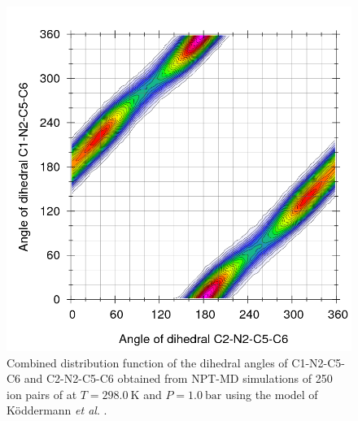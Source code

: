\documentclass[3p,onecolumn]{elsarticle}
\begin{document}
\begin{figure}
	\centering
	\includegraphics[width=\linewidth]{Ludwig}%
	
	\caption{Combined distribution function of the dihedral angles of C1-N2-C5-C6 and C2-N2-C5-C6 obtained from NPT-MD simulations of 250 ion pairs of \ce{[emim][NTf_2]} at $T = 298.0~\mathrm{K}$ and $P = 1.0~\mathrm{bar}$ using the model of K\"{o}ddermann \textit{et al}. \cite{Koddermann_2007}.}
	\label{fig:die_ntf2}
\end{figure}


\end{document}
